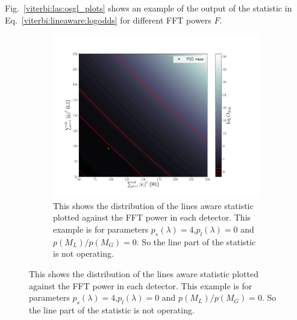 Fig.~\ref{viterbi:las:osgl_plots} shows an example of the output of the statistic in Eq.~\ref{viterbi:lineaware:logodds} for different \ac{FFT} powers $F$.
\begin{figure}
\centering

\begin{subfigure}[h]{\linewidth}
\begin{minipage}{0.65\linewidth}
\includegraphics[width=1.\linewidth]{C3_soap/lookup_noline.pdf}
\end{minipage}\hfill
\begin{minipage}{0.35\linewidth}
\caption{This shows the distribution of the lines aware statistic plotted against the \ac{FFT} power in each detector. This example is for parameters $p_s(\lambda) = 4$,$p_l(\lambda) = 0$ and $p(M_L)/p(M_G) = 0$. So the line part of the statistic is not operating.}
\label{viterbi:plot:data}
\end{minipage}
\end{subfigure}


\end{figure}

